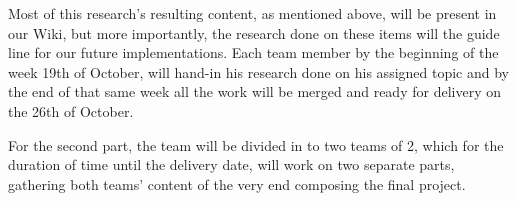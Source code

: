 \documentclass[]{article}
\begin{document}
Most of this research's resulting content, as mentioned above, will be present in our Wiki, but more importantly, the research done on these items will the guide line for our future implementations.
Each team member by the beginning of the week 19th of October, will hand-in his research done on his assigned topic and by the end of that same week all the work will be merged and ready for delivery on the 26th of October.

For the second part, the team will be divided in to two teams of 2, which for the duration of time until the delivery date, will work on two separate parts, gathering both teams' content of the very end composing the final project.



 
\end{document}
